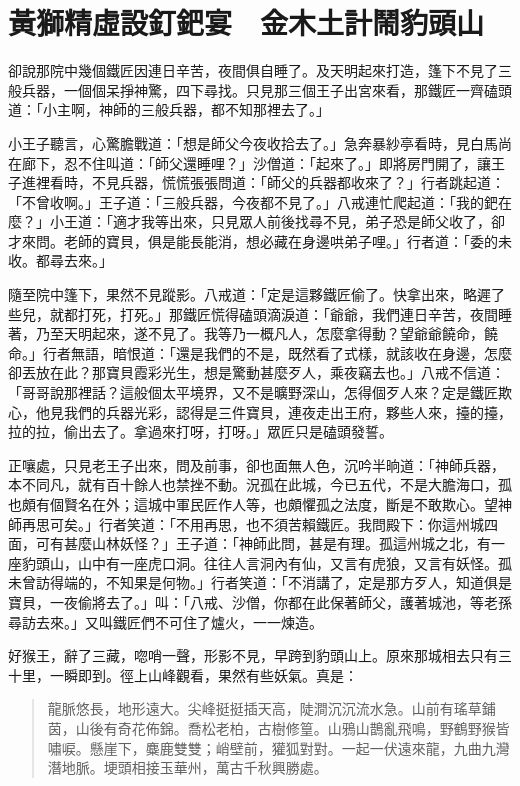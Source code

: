 
\chapter{黃獅精虛設釘鈀宴　金木土計鬧豹頭山}

卻說那院中幾個鐵匠因連日辛苦，夜間俱自睡了。及天明起來打造，篷下不見了三般兵器，一個個呆掙神驚，四下尋找。只見那三個王子出宮來看，那鐵匠一齊磕頭道：「小主啊，神師的三般兵器，都不知那裡去了。」

小王子聽言，心驚膽戰道：「想是師父今夜收拾去了。」急奔暴紗亭看時，見白馬尚在廊下，忍不住叫道：「師父還睡哩？」沙僧道：「起來了。」即將房門開了，讓王子進裡看時，不見兵器，慌慌張張問道：「師父的兵器都收來了？」行者跳起道：「不曾收啊。」王子道：「三般兵器，今夜都不見了。」八戒連忙爬起道：「我的鈀在麼？」小王道：「適才我等出來，只見眾人前後找尋不見，弟子恐是師父收了，卻才來問。老師的寶貝，俱是能長能消，想必藏在身邊哄弟子哩。」行者道：「委的未收。都尋去來。」

隨至院中篷下，果然不見蹤影。八戒道：「定是這夥鐵匠偷了。快拿出來，略遲了些兒，就都打死，打死。」那鐵匠慌得磕頭滴淚道：「爺爺，我們連日辛苦，夜間睡著，乃至天明起來，遂不見了。我等乃一概凡人，怎麼拿得動？望爺爺饒命，饒命。」行者無語，暗恨道：「還是我們的不是，既然看了式樣，就該收在身邊，怎麼卻丟放在此？那寶貝霞彩光生，想是驚動甚麼歹人，乘夜竊去也。」八戒不信道：「哥哥說那裡話？這般個太平境界，又不是曠野深山，怎得個歹人來？定是鐵匠欺心，他見我們的兵器光彩，認得是三件寶貝，連夜走出王府，夥些人來，擡的擡，拉的拉，偷出去了。拿過來打呀，打呀。」眾匠只是磕頭發誓。

正嚷處，只見老王子出來，問及前事，卻也面無人色，沉吟半晌道：「神師兵器，本不同凡，就有百十餘人也禁挫不動。況孤在此城，今已五代，不是大膽海口，孤也頗有個賢名在外；這城中軍民匠作人等，也頗懼孤之法度，斷是不敢欺心。望神師再思可矣。」行者笑道：「不用再思，也不須苦賴鐵匠。我問殿下：你這州城四面，可有甚麼山林妖怪？」王子道：「神師此問，甚是有理。孤這州城之北，有一座豹頭山，山中有一座虎口洞。往往人言洞內有仙，又言有虎狼，又言有妖怪。孤未曾訪得端的，不知果是何物。」行者笑道：「不消講了，定是那方歹人，知道俱是寶貝，一夜偷將去了。」叫：「八戒、沙僧，你都在此保著師父，護著城池，等老孫尋訪去來。」又叫鐵匠們不可住了爐火，一一煉造。

好猴王，辭了三藏，唿哨一聲，形影不見，早跨到豹頭山上。原來那城相去只有三十里，一瞬即到。徑上山峰觀看，果然有些妖氣。真是：
\begin{quote}
龍脈悠長，地形遠大。尖峰挺挺插天高，陡澗沉沉流水急。山前有瑤草鋪茵，山後有奇花佈錦。喬松老柏，古樹修篁。山鴉山鵲亂飛鳴，野鶴野猴皆嘯唳。懸崖下，麋鹿雙雙；峭壁前，獾狐對對。一起一伏遠來龍，九曲九灣潛地脈。埂頭相接玉華州，萬古千秋興勝處。
\end{quote}

